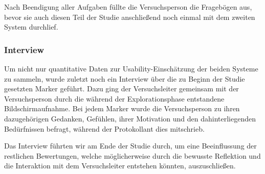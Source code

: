 Nach Beendigung aller Aufgaben füllte die Versuchsperson die Fragebögen aus, bevor sie auch diesen Teil der Studie anschließend noch einmal mit dem zweiten System durchlief.



\subsubsection{Interview}
Um nicht nur quantitative Daten zur Usability-Einschätzung der beiden Systeme zu sammeln, wurde zuletzt noch ein Interview über die zu Beginn der Studie gesetzten Marker geführt. Dazu ging der Versuchsleiter gemeinsam mit der Versuchsperson durch die während der Explorationsphase entstandene Bildschirmaufnahme. Bei jedem Marker wurde die Versuchsperson zu ihren dazugehörigen Gedanken, Gefühlen, ihrer Motivation und den dahinterliegenden Bedürfnissen befragt, während der Protokollant dies mitschrieb.

Das Interview führten wir am Ende der Studie durch, um eine Beeinflussung der restlichen Bewertungen, welche möglicherweise durch die bewusste Reflektion und die Interaktion mit dem Versuchsleiter entstehen könnten, auszuschließen.